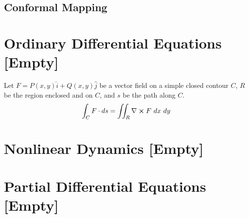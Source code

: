 \documentclass[12pt, english]{book}
\begin{document}
	
	
	
	
	
	
	
	
	
	
	
	
	
	
	
	
	
	
	
	
	
	
	
	
	
	
	
	
	
	
	
	
	
	
	
	
	
	
	
	
	
	
	
	
	
	
	\chapter{Conformal Mapping} \label{Conformal Mapping Chapter - Complex}
	
	
	
	
	\part{Ordinary Differential Equations [Empty]} \label{Ordinary Differential Equations Part}
	
	\begin{theorem}
		\label{Green's Theorem - ODE}
		Let \(F = P(x,y) \hat{i} + Q(x,y) \hat{j}\) be a vector field on a simple closed contour \(C\), \(R\) be the region enclosed and on \(C\), and \(s\) be the path along \(C\).
		\begin{align*}
			\int_C F \cdot ds = \iint_R \nabla \cross F \ dx \ dy
		\end{align*}
	\end{theorem}
	
	\part{Nonlinear Dynamics [Empty]} \label{Nonlinear Dynamics Part}
	
	
	\part{Partial Differential Equations [Empty]} \label{Partial Differential Equations Part}
	
\end{document}
